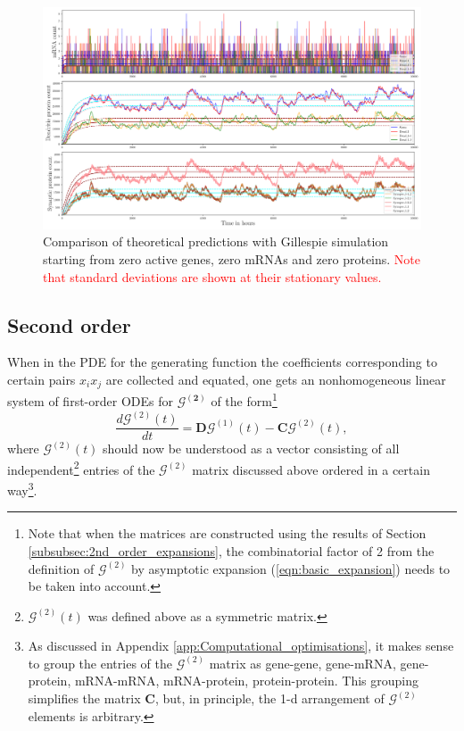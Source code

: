 \documentclass[a4paper, 11pt]{article}
\begin{document}
\begin{figure}
  \begin{center}
    \includegraphics[width=15cm]{img/protein_numbers.png}
  \end{center}  
  \caption{Comparison of theoretical predictions with Gillespie simulation starting from zero active genes, zero mRNAs and zero proteins. \textcolor{red}{Note that standard deviations are shown at their stationary values.}}
  \label{fig:Gillespie_simulation}
\end{figure}

\subsection{Second order}
When in the PDE for the generating function the coefficients corresponding to certain pairs $x_ix_j$ are collected and equated, one gets an nonhomogeneous linear system of first-order ODEs for $\boldsymbol{\mathcal G^{(2)}}$ of the form\footnote{Note that when the matrices are constructed using the results of Section \ref{subsubsec:2nd_order_expansions}, the combinatorial factor of 2 from the definition of $\boldsymbol{\mathcal G}^{(2)}$ by asymptotic expansion (\ref{eqn:basic_expansion}) needs to be taken into account.}
\begin{equation}\label{o2_nonstat_ODE}
  \frac{d\boldsymbol{\mathcal G}^{(2)}(t)}{dt} = \mathbf D\boldsymbol{\mathcal G}^{(1)}(t) - \mathbf C\boldsymbol{\mathcal G}^{(2)}(t),
\end{equation}
where $\boldsymbol{\mathcal G}^{(2)}(t)$ should now be understood as a vector consisting of all independent\footnote{$\boldsymbol{\mathcal G}^{(2)}(t)$ was defined above as a symmetric matrix.} entries of the $\boldsymbol{\mathcal G}^{(2)}$ matrix discussed above ordered in a certain way\footnote{As discussed in Appendix \ref{app:Computational_optimisations}, it makes sense to group the entries of the $\boldsymbol{\mathcal G}^{(2)}$ matrix as gene-gene, gene-mRNA, gene-protein, mRNA-mRNA, mRNA-protein, protein-protein. This grouping simplifies the matrix $\mathbf C$, but, in principle, the 1-d arrangement of $\boldsymbol{\mathcal G}^{(2)}$ elements is arbitrary.}.
\end{document}
